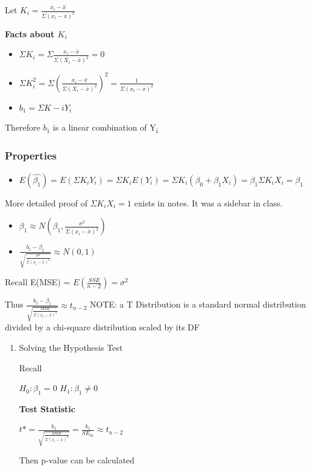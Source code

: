 \documentclass[11pt]{article}
\begin{document}
Let \(K_i = \frac{x_i - \bar{x}}{\Sigma(x_i - \bar{x})^2}\)

\textbf{Facts about \(K_i\)}
\begin{itemize}
\item \(\Sigma{K_i} = \Sigma \frac{x_i - \bar{x}}{\Sigma (X_i - \bar{x})^2} = 0\)
\item \(\Sigma K_i^2 = \Sigma (\frac{x_i - \bar{x}}{\Sigma (X_i - \bar{x})^2})^2 = \frac{1}{\Sigma{(x_i - \bar{x})^2}}\)

\item \(b_1 = \Sigma K-i Y_i\)
\end{itemize}

Therefore \(b_1\) is a linear combination of Y\textsubscript{i}
\subsubsection{Properties}
\label{sec:org15821cf}
\begin{itemize}
\item \(E(\hat{\beta_1}) = E(\Sigma K_i Y_i) = \Sigma K_i E(Y_i) = \Sigma K_i
  (\beta_0 + \beta_1 X_i) = \beta_1 \Sigma K_i X_i = \beta_1\)
\end{itemize}

More detailed proof of \(\Sigma K_i X_i = 1\) exists in notes. It was a sidebar in
class.

\begin{itemize}
\item \(\beta_1 \approx N(\beta_1, \frac{\sigma^2}{\Sigma(x_i - \bar{x})^2})\)
\item \(\frac{b_1 - \beta_1}{\sqrt{\frac{\sigma^2}{\Sigma(x_i - \bar{x})^2}}} \approx
  N(0,1)\)
\end{itemize}

Recall E(MSE) = \(E(\frac{SSE}{n - 2}) = \sigma^2\)

Thus \(\frac{b_1 - \beta_1}{\sqrt{\frac{MSE}{\Sigma(x_i - \bar{x})^2}}} \approx
  t_{n-2}\)
NOTE: a T Distribution is a standard normal distribution divided by a chi-square
  distribution scaled by its DF

\begin{enumerate}
\item Solving the Hypothesis Test
\label{sec:orgcb30490}

Recall

\(H_0: \beta_1 = 0\)
\(H_1: \beta_1 \neq 0\)


\textbf{Test Statistic}

\(t* = \frac{b_1}{\sqrt{\frac{MSE}{\Sigma(x_i - \bar{x})^2}}} =
\frac{b_1}{SE_{b1}} \approx t_{n - 2}\)

Then p-value can be calculated
\end{enumerate}
\end{document}
